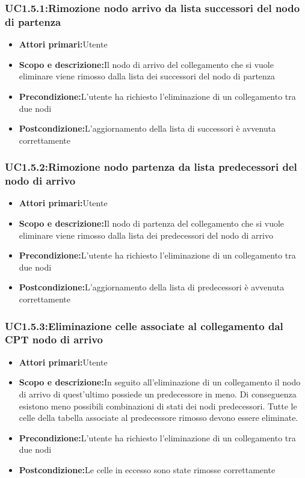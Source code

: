 \subsubsection{UC1.5.1:Rimozione nodo arrivo da lista successori del nodo di partenza}
\begin{itemize}
	\item{\textbf{Attori primari:}Utente}
	\item{\textbf{Scopo e descrizione:}Il nodo di arrivo del collegamento che si vuole eliminare viene rimosso dalla lista dei successori del nodo di partenza}
	\item{\textbf{Precondizione:}L'utente ha richiesto l'eliminazione di un collegamento tra due nodi}
	\item{\textbf{Postcondizione:}L'aggiornamento della lista di successori è avvenuta correttamente}
\end{itemize}
\subsubsection{UC1.5.2:Rimozione nodo partenza da lista predecessori del nodo di arrivo}
\begin{itemize}
	\item{\textbf{Attori primari:}Utente}
	\item{\textbf{Scopo e descrizione:}Il nodo di partenza del collegamento che si vuole eliminare viene rimosso dalla lista dei predecessori del nodo di arrivo}
	\item{\textbf{Precondizione:}L'utente ha richiesto l'eliminazione di un collegamento tra due nodi}
	\item{\textbf{Postcondizione:}L'aggiornamento della lista di predecessori è avvenuta correttamente}
\end{itemize}
\subsubsection{UC1.5.3:Eliminazione celle associate al collegamento dal CPT nodo di arrivo}
\begin{itemize}
	\item{\textbf{Attori primari:}Utente}
	\item{\textbf{Scopo e descrizione:}In seguito all'eliminazione di un collegamento il nodo di arrivo di quest'ultimo possiede un predecessore in meno. Di conseguenza esistono meno possibili combinazioni di stati dei nodi predecessori. Tutte le celle della tabella associate al predecessore rimosso devono essere eliminate.}
	\item{\textbf{Precondizione:}L'utente ha richiesto l'eliminazione di un collegamento tra due nodi}
	\item{\textbf{Postcondizione:}Le celle in eccesso sono state rimosse correttamente}
\end{itemize}
